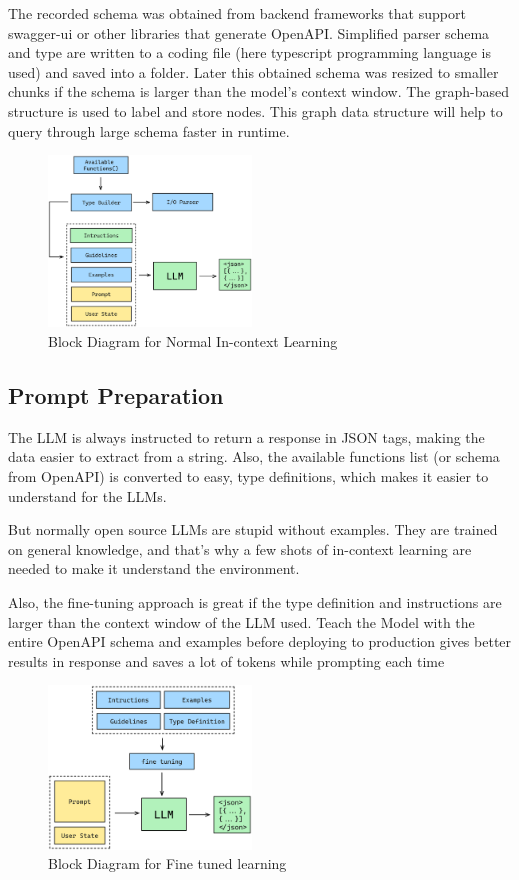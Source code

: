 \documentclass[conference]{IEEEtran}
\begin{document}
The recorded schema was obtained from backend frameworks that support swagger-ui or other libraries that generate OpenAPI. Simplified parser schema and type are written to a coding file (here typescript programming language is used) and saved into a folder. Later this obtained schema was resized to smaller chunks if the schema is larger than the model's context window. The graph-based structure is used to label and store nodes. This graph data structure will help to query through large schema faster in runtime.

\begin{figure}[htbp]
    \centering
    \includegraphics[width=0.48\textwidth]{images/without-finetuning.png}  
    \caption{Block Diagram for Normal In-context Learning}
    \label{fig}
\end{figure}

\subsection{Prompt Preparation}

The LLM is always instructed to return a response in JSON tags, making the data easier to extract from a string. Also, the available functions list (or schema from OpenAPI) is converted to easy, type definitions, which makes it easier to understand for the LLMs. 

But normally open source LLMs are stupid without examples. They are trained on general knowledge, and that's why a few shots of in-context learning are needed to make it understand the environment. 

Also, the fine-tuning approach is great if the type definition and instructions are larger than the context window of the LLM used. Teach the Model with the entire OpenAPI schema and examples before deploying to production gives better results in response and saves a lot of tokens while prompting each time

\begin{figure}[htbp]
\centering
\includegraphics[width=0.48\textwidth]{images/fine-tuned.png}  
\caption{Block Diagram for Fine tuned learning}
\label{fig}
\end{figure}
\end{document}
